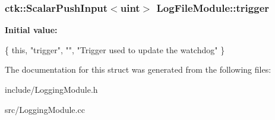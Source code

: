 \subsubsection[{\texorpdfstring{trigger}{trigger}}]{\setlength{\rightskip}{0pt plus 5cm}ctk\+::\+Scalar\+Push\+Input$<$uint$>$ Log\+File\+Module\+::trigger}\hypertarget{structLogFileModule_ab506250407b187e59c9d3ed81d35b84b}{}\label{structLogFileModule_ab506250407b187e59c9d3ed81d35b84b}
{\bfseries Initial value\+:}
\begin{DoxyCode}
\{ \textcolor{keyword}{this}, \textcolor{stringliteral}{"trigger"}, \textcolor{stringliteral}{""},
    \textcolor{stringliteral}{"Trigger used to update the watchdog"} \}
\end{DoxyCode}


The documentation for this struct was generated from the following files\+:\begin{DoxyCompactItemize}
\item 
include/Logging\+Module.\+h\item 
src/Logging\+Module.\+cc\end{DoxyCompactItemize}

